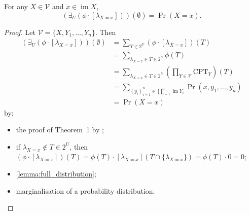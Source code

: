 \documentclass[accepted]{uai2021}
\DeclareMathOperator{\im}{im}
\newenvironment{customthm}[1]
{\renewcommand\theinnercustomthm{#1}\innercustomthm}
{\endinnercustomthm}
\begin{document}
\begin{customthm}{4}
  For any $X \in \mathcal{V}$ and $x \in \im X$,
  \[
    (\exists_U(\phi \cdot [\lambda_{X=x}]))(\emptyset) = \Pr(X = x).
  \]
\end{customthm}
\begin{proof}
  Let $\mathcal{V} = \{ X, Y_1, \dots, Y_n \}$. Then
  \begin{align*}
    (\exists_U (\phi \cdot [\lambda_{X=x}]))(\emptyset) &= \sum_{T \in 2^U} (\phi \cdot [\lambda_{X=x}])(T) \\
                                                        &= \sum_{\lambda_{X=x} \in T \in 2^U} \phi(T) \\
                                                        &= \sum_{\lambda_{X=x} \in T \in 2^U} \left( \prod_{Y \in \mathcal{V}} \mathrm{CPT}_Y \right)(T) \\
                                                        &= \sum_{(y_i)_{i=1}^n \in \prod_{i=1}^n \im Y_i} \Pr(x, y_1, \dots, y_n) \\
                                                        &= \Pr(X = x)
  \end{align*}
  by:
  \begin{itemize}
  \item the proof of Theorem~1 by \citet{DBLP:conf/aaai/DudekPV20};
  \item if $\lambda_{X=x} \not\in T \in 2^U$, then $(\phi \cdot
    [\lambda_{X=x}])(T) = \phi(T) \cdot [\lambda_{X=x}](T \cap \{
    \lambda_{X=x} \}) = \phi(T) \cdot 0 = 0$;
  \item \cref{lemma:full_distribution};
  \item marginalisation of a probability distribution.
  \end{itemize}
\end{proof}


\end{document}
